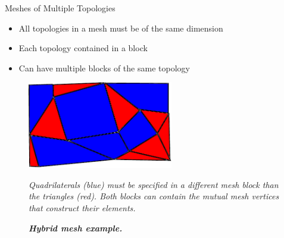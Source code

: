 \documentclass{beamer}
\begin{document}
\begin{frame}{Meshes of Multiple Topologies}

  \begin{itemize}
  \item All topologies in a mesh must be of the same dimension
  \item Each topology contained in a block
  \item Can have multiple blocks of the same topology
  \end{itemize}


  \begin{figure}[htpb!]
    \centering \includegraphics[width=2.5in]{hybrid_mesh.pdf}
    \caption{\bf \sl Hybrid mesh example.} {\sl Quadrilaterals (blue)
      must be specified in a different mesh block than the triangles
      (red). Both blocks can contain the mutual mesh vertices that
      construct their elements.}
    \label{fig:hybrid_mesh}
  \end{figure}

\end{frame}

\end{document}
